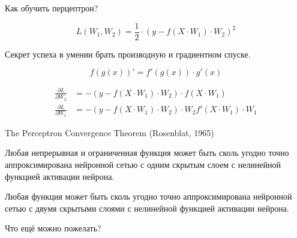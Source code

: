 \documentclass[notes,12pt, aspectratio=169]{beamer}
\newenvironment{wideitemize}{\itemize\addtolength{\itemsep}{10pt}}{\enditemize}
\begin{document}
{
\begin{frame}

\end{frame}
}

\begin{frame}{Как обучить перцептрон?}

\[ L(W_1, W_2) =  \frac{1}{2} \cdot (y - f(X \cdot W_1) \cdot W_2)^2\]

Секрет успеха в умении брать производную и градиентном спуске.

\[f(g(x))' = f'(g(x)) \cdot g'(x) \]

\begin{equation*} 
\begin{aligned} 
\frac{\partial L}{\partial W_2} &= - (y - f(X \cdot W_1) \cdot W_2) \cdot f(X \cdot W_1) \\
\frac{\partial L}{\partial W_1} &= - (y - f(X \cdot W_1) \cdot W_2) \cdot W_2 f'(X \cdot W_1) \cdot W_1 
\end{aligned}
\end{equation*}
\end{frame}



\begin{frame}{The Perceptron Convergence Theorem (Rosenblat, 1965)}

\begin{wideitemize}
	\item Любая непрерывная и ограниченная функция может быть сколь угодно точно аппроксимирована нейронной сетью с одним скрытым слоем с нелинейной функцией активации нейрона.
	
	\item Любая функция может быть сколь угодно точно аппроксимирована нейронной сетью с двумя скрытыми слоями с нелинейной функцией активации нейрона.
	
	\item Что ещё можно пожелать?
\end{wideitemize}
\end{frame}
\end{document}
